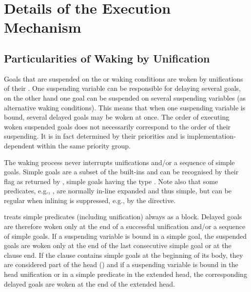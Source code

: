 \section{Details of the Execution Mechanism}

\subsection{Particularities of Waking by Unification}
Goals that are suspended on the  or  waking
conditions are woken by unifications of their
.
One suspending variable can be responsible for delaying several goals,
on the other hand one goal can be suspended on several
suspending variables (as alternative waking conditions).
This means that when one suspending variable is bound,
several delayed goals may be woken at once.
The order of executing woken suspended goals does not necessarily correspond
to the order of their suspending. It is in fact determined by their
priorities and is implementation-dependent within the same priority group.

The waking process never interrupts unifications and/or a sequence
of simple goals.
Simple goals are a subset of the built-ins and
can be recognised by their 
flag as returned by
,
simple goals having the type .
Note also that some predicates, e.g.,
,
are normally in-line expanded and thus simple, but can be regular when
inlining is suppressed, e.g., by the  directive.

{\eclipse} treats simple predicates (including unification) always as a block.
Delayed goals are therefore woken only at the end of a successful
unification and/or a sequence of simple goals.
If a suspending variable is bound in a simple goal, the suspended
goals are woken only at the end of the last consecutive simple
goal or at the clause end.
If the clause contains simple goals at the beginning of its
body, they are considered part of the head ()
and if a suspending variable is bound in the head unification or
in a simple predicate in the extended head, the corresponding
delayed goals are woken at the end of the extended head.

